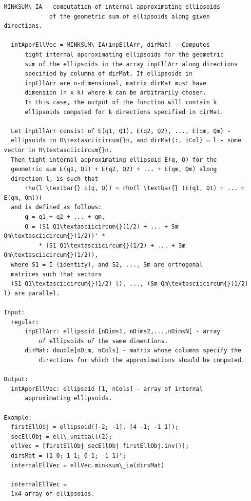 \documentclass[letterpaper,10pt,english]{sphinxmanual}
\begin{document}
\begin{Verbatim}[commandchars=\\\{\}]
MINKSUM\_IA - computation of internal approximating ellipsoids
             of the geometric sum of ellipsoids along given directions.

  intApprEllVec = MINKSUM\_IA(inpEllArr, dirMat) - Computes
      tight internal approximating ellipsoids for the geometric
      sum of the ellipsoids in the array inpEllArr along directions
      specified by columns of dirMat. If ellipsoids in
      inpEllArr are n-dimensional, matrix dirMat must have
      dimension (n x k) where k can be arbitrarily chosen.
      In this case, the output of the function will contain k
      ellipsoids computed for k directions specified in dirMat.

  Let inpEllArr consist of E(q1, Q1), E(q2, Q2), ..., E(qm, Qm) -
  ellipsoids in R\textasciicircum{}n, and dirMat(:, iCol) = l - some vector in R\textasciicircum{}n.
  Then tight internal approximating ellipsoid E(q, Q) for the
  geometric sum E(q1, Q1) + E(q2, Q2) + ... + E(qm, Qm) along
  direction l, is such that
      rho(l \textbar{} E(q, Q)) = rho(l \textbar{} (E(q1, Q1) + ... + E(qm, Qm)))
  and is defined as follows:
      q = q1 + q2 + ... + qm,
      Q = (S1 Q1\textasciicircum{}(1/2) + ... + Sm Qm\textasciicircum{}(1/2))' *
          * (S1 Q1\textasciicircum{}(1/2) + ... + Sm Qm\textasciicircum{}(1/2)),
  where S1 = I (identity), and S2, ..., Sm are orthogonal
  matrices such that vectors
  (S1 Q1\textasciicircum{}(1/2) l), ..., (Sm Qm\textasciicircum{}(1/2) l) are parallel.

Input:
  regular:
      inpEllArr: ellipsoid [nDims1, nDims2,...,nDimsN] - array
          of ellipsoids of the same dimentions.
      dirMat: double[nDim, nCols] - matrix whose columns specify the
          directions for which the approximations should be computed.

Output:
  intApprEllVec: ellipsoid [1, nCols] - array of internal
      approximating ellipsoids.

Example:
  firstEllObj = ellipsoid([-2; -1], [4 -1; -1 1]);
  secEllObj = ell\_unitball(2);
  ellVec = [firstEllObj secEllObj firstEllObj.inv()];
  dirsMat = [1 0; 1 1; 0 1; -1 1]';
  internalEllVec = ellVec.minksum\_ia(dirsMat)

  internalEllVec =
  1x4 array of ellipsoids.
\end{Verbatim}
\end{document}
